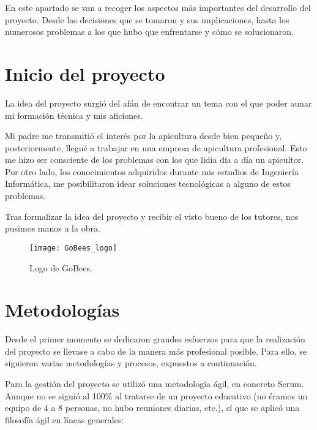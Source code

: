 
En este apartado se van a recoger los aspectos más importantes del
desarrollo del proyecto. Desde las decisiones que se tomaron y sus
implicaciones, hasta los numerosos problemas a los que hubo que
enfrentarse y cómo se solucionaron.

\section{Inicio del proyecto}\label{inicio-del-proyecto}

La idea del proyecto surgió del afán de encontrar un tema con el que
poder aunar mi formación técnica y mis aficiones.

Mi padre me transmitió el interés por la apicultura desde bien pequeño
y, posteriormente, llegué a trabajar en una empresa de apicultura
profesional. Esto me hizo ser consciente de los problemas con los que
lidia día a día un apicultor. Por otro lado, los conocimientos
adquiridos durante mis estudios de Ingeniería Informática, me
posibilitaron idear soluciones tecnológicas a alguno de estos problemas.

Tras formalizar la idea del proyecto y recibir el visto bueno de los
tutores, nos pusimos manos a la obra.

\begin{figure}[H]
	\centering
	\texttt{[image: GoBees\_logo]}
	\caption{Logo de GoBees.}
	\label{fig:logo}
\end{figure}

\section{Metodologías}\label{metodologias-proyecto}

Desde el primer momento se dedicaron grandes esfuerzos para que la
realización del proyecto se llevase a cabo de la manera más profesional
posible. Para ello, se siguieron varias metodologías y procesos,
expuestos a continuación.

Para la gestión del proyecto se utilizó una metodología ágil, en
concreto Scrum. Aunque no se siguió al 100\% al tratarse de un proyecto
educativo (no éramos un equipo de 4 a 8 personas, no hubo reuniones
diarias, etc.), sí que se aplicó una filosofía ágil en líneas generales:

